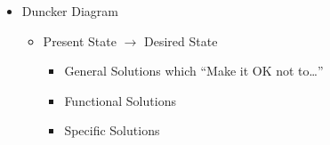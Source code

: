\begin{itemize}
\begin{itemize}
    \end{itemize}

  \item Duncker Diagram

    \begin{itemize}

      \item Present State $\rightarrow$ Desired State

        \begin{itemize}

          \item General Solutions which ``Make it OK not to\ldots''

          \item Functional Solutions

          \item Specific Solutions

        \end{itemize}

    \end{itemize}

\end{itemize}



